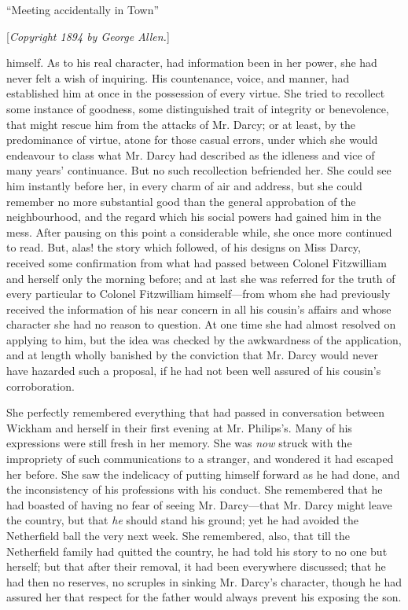 \documentclass[12pt,openright]{book}
\begin{document}
“Meeting accidentally in Town”

[\textit{Copyright 1894 by George Allen.}]

himself. As to his real character, had information been in her power, she had never felt a wish of inquiring. His countenance, voice, and manner, had established him at once in the possession of every virtue. She tried to recollect some instance of goodness, some distinguished trait of integrity or benevolence, that might rescue him from the attacks of Mr. Darcy; or at least, by the predominance of virtue, atone for those casual errors, under which she would endeavour to class what Mr. Darcy had described as the idleness and vice of many years’ continuance. But no such recollection befriended her. She could see him instantly before her, in every charm of air and address, but she could remember no more substantial good than the general approbation of the neighbourhood, and the regard which his social powers had gained him in the mess. After pausing on this point a considerable while, she once more continued to read. But, alas! the story which followed, of his designs on Miss Darcy, received some confirmation from what had passed between Colonel Fitzwilliam and herself only the morning before; and at last she was referred for the truth of every particular to Colonel Fitzwilliam himself—from whom she had previously received the information of his near concern in all his cousin’s affairs and whose character she had no reason to question. At one time she had almost resolved on applying to him, but the idea was checked by the awkwardness of the application, and at length wholly banished by the conviction that Mr. Darcy would never have hazarded such a proposal, if he had not been well assured of his cousin’s corroboration.

She perfectly remembered everything that had passed in conversation between Wickham and herself in their first evening at Mr. Philips’s. Many of his expressions were still fresh in her memory. She was \textit{now} struck with the impropriety of such communications to a stranger, and wondered it had escaped her before. She saw the indelicacy of putting himself forward as he had done, and the inconsistency of his professions with his conduct. She remembered that he had boasted of having no fear of seeing Mr. Darcy—that Mr. Darcy might leave the country, but that \textit{he} should stand his ground; yet he had avoided the Netherfield ball the very next week. She remembered, also, that till the Netherfield family had quitted the country, he had told his story to no one but herself; but that after their removal, it had been everywhere discussed; that he had then no reserves, no scruples in sinking Mr. Darcy’s character, though he had assured her that respect for the father would always prevent his exposing the son.
\end{document}
